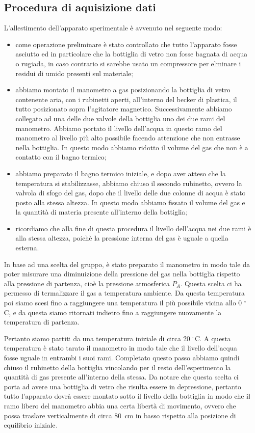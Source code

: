\subsection{Procedura di aquisizione dati}
L'allestimento dell'apparato sperimentale è avvenuto nel seguente modo:

\begin{itemize}
	\item{come operazione preliminare è stato controllato che tutto l'apparato fosse asciutto ed in particolare che la bottiglia di vetro non fosse bagnata di acqua o rugiada, in caso contrario si sarebbe usato un compressore per elminare i residui di umido presenti sul materiale;}
	\item{abbiamo montato il manometro a gas posizionando la bottiglia di vetro contenente aria, con i rubinetti aperti, all'interno del becker di plastica, il tutto posizionato sopra l'agitatore magnetico. Successivamente abbiamo collegato ad una delle due valvole della bottiglia uno dei due rami del manometro. Abbiamo portato il livello dell'acqua in questo ramo del manometro al livello più alto possibile facendo attenzione che non entrasse nella bottiglia. In questo modo abbiamo ridotto il volume del gas che non è a contatto con il bagno termico;}
	\item{abbiamo preparato il bagno termico iniziale, e dopo aver atteso che la temperatura si stabilizzasse, abbiamo chiuso il secondo rubinetto, ovvero la valvola di sfogo del gas, dopo che il livello delle due colonne di acqua è stato posto alla stessa altezza. In questo modo abbiamo fissato il volume del gas e la quantità di materia presente all'interno della bottiglia;}
	\item{ricordiamo che alla fine di questa procedura il livello dell'acqua nei due rami è alla stessa altezza, poichè la pressione interna del gas è uguale a quella esterna.}
\end{itemize}
%

In base ad una scelta del gruppo, è stato preparato il manometro in modo tale da poter misurare una diminuizione della pressione del gas nella bottiglia rispetto alla pressione di partenza, cioè la pressione atmosferica $P_A$. Questa scelta ci ha permesso di termalizzare il gas a temperatura ambiente. Da questa temperatura poi siamo scesi fino a raggiungere una temperatura il più possibile vicina allo 0 $^\circ$C, e da questa siamo ritornati indietro fino a raggiungere nuovamente la temperatura di partenza.

Pertanto siamo partiti da una temperatura iniziale di circa 20 $^\circ$C. A questa temperatura è stato tarato il manometro in modo tale che il livello dell'acqua fosse uguale in entrambi i suoi rami. Completato questo passo abbiamo quindi chiuso il rubinetto della bottiglia vincolando per il resto dell'esperimento la quantità di gas presente all'interno della stessa. Da notare che questa scelta ci porta ad avere una bottiglia di vetro che risulta essere in depressione, pertanto tutto l'apparato dovrà essere montato sotto il livello della bottiglia in modo che il ramo libero del manometro abbia una certa libertà di movimento, ovvero che possa traslare verticalmente di circa \SI{80}{\centi\metre} in basso rispetto alla posizione di equilibrio iniziale.

